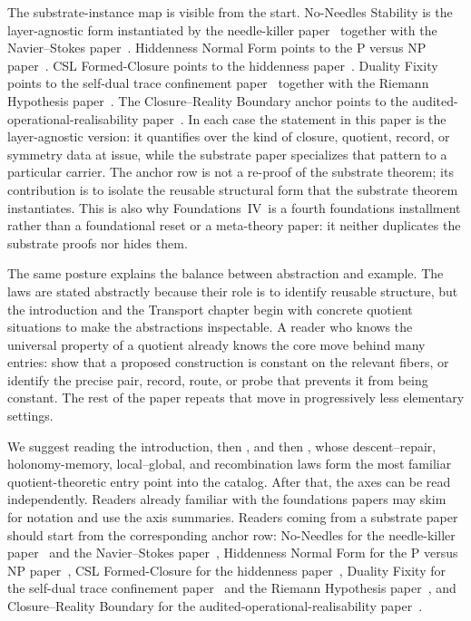 \documentclass[11pt]{article}
\newcommand{\FIV}{Foundations~IV}
\newcommand{\PaperSDTC}{the self-dual trace confinement paper}
\newcommand{\PaperAOR}{the audited-operational-realisability paper}
\newcommand{\PaperNeedleKiller}{the needle-killer paper}
\newcommand{\PaperNS}{the Navier--Stokes paper}
\newcommand{\PaperRH}{the Riemann Hypothesis paper}
\newcommand{\PaperPvNP}{the P versus NP paper}
\newcommand{\PaperCSL}{the hiddenness paper}
\theoremstyle{definition}
\begin{document}
The substrate-instance map is visible from the start.  No-Needles
Stability is the layer-agnostic form instantiated by
\PaperNeedleKiller\ \citep{Tsiokos2026NeedleKiller} together with
\PaperNS\ \citep{Tsiokos2026NavierStokes}.  Hiddenness Normal Form
points to \PaperPvNP\ \citep{Tsiokos2026PvNP}.  CSL Formed-Closure
points to \PaperCSL\ \citep{Tsiokos2026CSL}.  Duality Fixity points
to \PaperSDTC\ \citep{Tsiokos2026SDTC} together with \PaperRH\
\citep{Tsiokos2026RH}.  The Closure--Reality Boundary anchor points
to \PaperAOR\ \citep{Tsiokos2026AOR}.  In each case the statement in
this paper is the layer-agnostic version: it quantifies over the
kind of closure, quotient, record, or symmetry data at issue, while
the substrate paper specializes that pattern to a particular
carrier.  The anchor row is not a re-proof of the substrate theorem;
its contribution is to isolate the reusable structural form that the
substrate theorem instantiates.  This is also why \FIV\ is a fourth
foundations installment rather than a foundational reset or a
meta-theory paper: it neither duplicates the substrate proofs nor
hides them.

The same posture explains the balance between abstraction and
example.  The laws are stated abstractly because their role is to
identify reusable structure, but the introduction and the Transport
chapter begin with concrete quotient situations to make the
abstractions inspectable.  A reader who knows the universal property
of a quotient already knows the core move behind many entries: show
that a proposed construction is constant on the relevant fibers, or
identify the precise pair, record, route, or probe that prevents it
from being constant.  The rest of the paper repeats that move in
progressively less elementary settings.

We suggest reading the introduction, then , and
then \Cref{sec:transport}, whose descent--repair, holonomy-memory,
local--global, and recombination laws form the most familiar
quotient-theoretic entry point into the catalog.  After that, the
axes can be read independently.  Readers already familiar with the
foundations papers may skim \Cref{sec:apparatus} for notation and
use the axis summaries.  Readers coming from a substrate paper should start from the
corresponding anchor row: No-Needles for \PaperNeedleKiller\
\citep{Tsiokos2026NeedleKiller} and \PaperNS\
\citep{Tsiokos2026NavierStokes}, Hiddenness Normal Form for
\PaperPvNP\ \citep{Tsiokos2026PvNP}, CSL Formed-Closure for
\PaperCSL\ \citep{Tsiokos2026CSL}, Duality Fixity for \PaperSDTC\
\citep{Tsiokos2026SDTC} and \PaperRH\ \citep{Tsiokos2026RH}, and
Closure--Reality Boundary for \PaperAOR\ \citep{Tsiokos2026AOR}.
\end{document}
